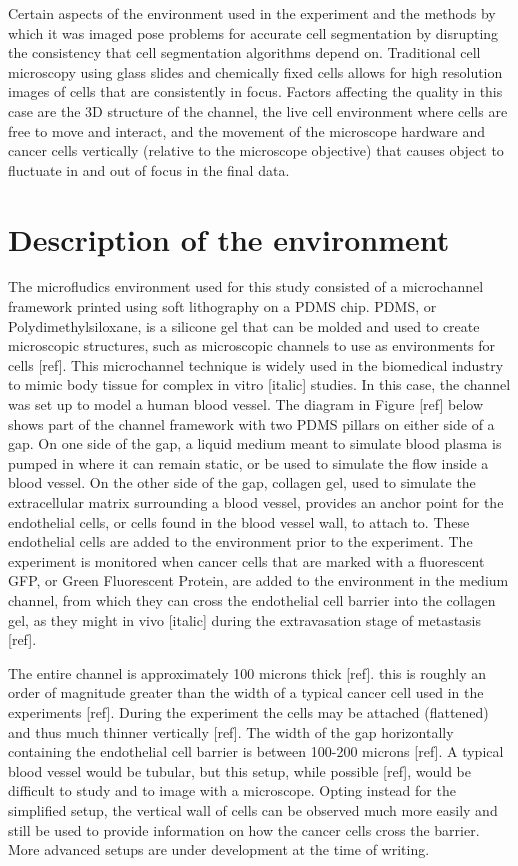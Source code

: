 Certain aspects of the environment used in the experiment and the methods by which it was imaged pose problems for accurate cell segmentation by disrupting the consistency that cell segmentation algorithms depend on. Traditional cell microscopy using glass slides and chemically fixed cells allows for high resolution images of cells that are consistently in focus. Factors affecting the quality in this case are the 3D structure of the channel, the live cell environment where cells are free to move and interact, and the movement of the microscope hardware and cancer cells vertically (relative to the microscope objective) that causes object to fluctuate in and out of focus in the final data.

\section{Description of the environment}

The microfludics environment used for this study consisted of a microchannel framework printed using soft lithography on a PDMS chip. PDMS, or Polydimethylsiloxane, is a silicone gel that can be molded and used to create microscopic structures, such as microscopic channels to use as environments for cells [ref]. This microchannel technique is widely used in the biomedical industry to mimic body tissue for complex in vitro [italic] studies. In this case, the channel was set up to model a human blood vessel. The diagram in Figure [ref] below shows part of the channel framework with two PDMS pillars on either side of a gap. On one side of the gap, a liquid medium meant to simulate blood plasma is pumped in where it can remain static, or be used to simulate the flow inside a blood vessel. On the other side of the gap, collagen gel, used to simulate the extracellular matrix surrounding a blood vessel, provides an anchor point for the endothelial cells, or cells found in the blood vessel wall, to attach to. These endothelial cells are added to the environment prior to the experiment. The experiment is monitored when cancer cells that are marked with a fluorescent GFP, or Green Fluorescent Protein, are added to the environment in the medium channel, from which they can cross the endothelial cell barrier into the collagen gel, as they might in vivo [italic] during the extravasation stage of metastasis [ref].

The entire channel is approximately 100 microns thick [ref]. this is roughly an order of magnitude greater than the width of a typical cancer cell used in the experiments [ref]. During the experiment the cells may be attached (flattened) and thus much thinner vertically [ref]. The width of the gap horizontally containing the endothelial cell barrier is between 100-200 microns [ref]. A typical blood vessel would be tubular, but this setup, while possible [ref], would be difficult to study and to image with a microscope. Opting instead for the simplified setup, the vertical wall of cells can be observed much more easily and still be used to provide information on how the cancer cells cross the barrier. More advanced setups are under development at the time of writing.


